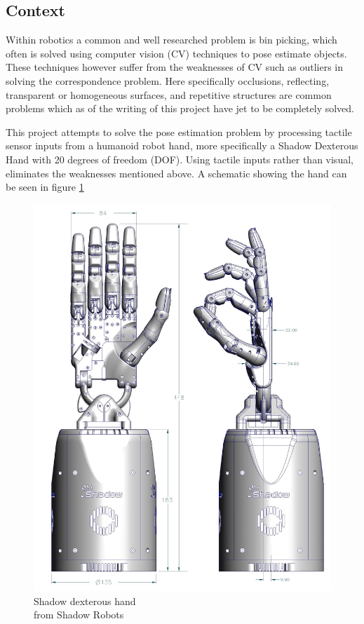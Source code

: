 \documentclass{article}
\begin{document}
\subsection*{Context}
\label{context}
\begin{minipage}{0.5\textwidth}
Within robotics a common and well researched problem is bin picking, which often is solved using computer vision (CV) techniques to pose estimate objects. These techniques however suffer from the weaknesses of CV such as outliers in solving the correspondence problem. Here specifically occlusions, reflecting, transparent or homogeneous surfaces, and repetitive structures are common problems which as of the writing of this project have jet to be completely solved.\par
This project attempts to solve the pose estimation problem by processing tactile sensor inputs from a humanoid robot hand, more specifically a Shadow Dexterous Hand\cite{shadow-dex-hand} with 20 degrees of freedom (DOF). Using tactile inputs rather than visual, eliminates the weaknesses mentioned above. A schematic showing the hand can be seen in figure \ref{fig:shadow-dex-hand}
\end{minipage} \hfill
\begin{minipage}{0.45\textwidth}
\begin{figure}[H]
\centering
\includegraphics[height=\textwidth]{figs/shadow-dex-hand.jpg}
\caption{ Shadow dexterous hand \\ from Shadow Robots\cite{shadow-dex-hand} }
\label{fig:shadow-dex-hand}
\end{figure}
\end{minipage}
\end{document}
